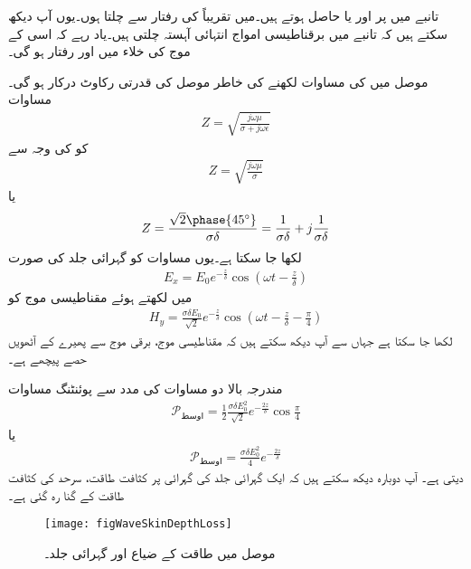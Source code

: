 تانبے میں  پر  اور  یا  حاصل ہوتے ہیں۔میں تقریباً  کی رفتار سے چلتا ہوں۔یوں آپ دیکھ سکتے ہیں کہ تانبے میں برقناطیسی امواج انتہائی آہستہ چلتی ہیں۔یاد رہے کہ اسی  کے موج کی خلاء میں  اور  رفتار  ہو گی۔

موصل میں  کی مساوات لکھنے کی خاطر موصل کی قدرتی رکاوٹ درکار ہو گی۔مساوات 
\begin{align*}
Z =\sqrt{\frac{j \omega \mu}{\sigma +j \omega \epsilon}}
\end{align*}
کو  کی وجہ سے
\begin{align*}
Z=\sqrt{\frac{j\omega\mu}{\sigma}}
\end{align*}
یا
\begin{align}\label{مساوات_موج_قدرتی_رکاوٹ_موصل_گہرائی_جلد_کے_ساتھ}
Z=\frac{\sqrt{2}\phase{45^\circ}}{\sigma \delta}=\frac{1}{\sigma \delta}+j\frac{1}{\sigma \delta}
\end{align}
لکھا جا سکتا ہے۔یوں مساوات  کو گہرائی جلد کی صورت
\begin{align}
E_x=E_0 e^{-\frac{z}{\delta}} \cos \left(\omega t -\frac{z}{\delta}\right)
\end{align}
 میں لکھتے ہوئے مقناطیسی موج کو
\begin{align}
H_y=\frac{\sigma \delta E_0}{\sqrt{2}} e^{-\frac{z}{\delta}} \cos \left(\omega t-\frac{z}{\delta}-\frac{\pi}{4}\right)
\end{align}
لکھا جا سکتا ہے جہاں سے آپ دیکھ سکتے ہیں کہ مقناطیسی موج، برقی موج سے  پھیرے کے آٹھویں حصے پیچھے ہے۔

مندرجہ بالا دو مساوات کی مدد سے پوئنٹنگ مساوات
 \begin{align*}
\mathscr{P}_{\text{اوسط}}=\frac{1}{2} \frac{\sigma \delta E_0^2}{\sqrt{2}} e^{-\frac{2 z}{\delta}} \cos \frac{\pi}{4}
\end{align*}
یا
\begin{align*}
\mathscr{P}_{\text{اوسط}}=\frac{\sigma \delta E_0^2}{4} e^{-\frac{2 z}{\delta}}
\end{align*}
دیتی ہے۔ آپ دوبارہ دیکھ سکتے ہیں کہ ایک گہرائی جلد کی گہرائی پر کثافت طاقت، سرحد کی کثافت طاقت کے  گنا رہ گئی ہے۔

\begin{figure}
\centering
\texttt{[image: figWaveSkinDepthLoss]}
\caption{موصل میں طاقت کے ضیاع اور گہرائی جلد۔}
\label{شکل_موج_گہرائی_جلد_اور_طاقتی_ضیاع}
\end{figure}

